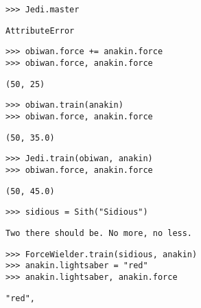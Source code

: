\begin{lstlisting}
>>> Jedi.master
\end{lstlisting}
\begin{solution}[.2in]
\begin{lstlisting}
AttributeError
\end{lstlisting}
\end{solution}

\begin{lstlisting}
>>> obiwan.force += anakin.force
>>> obiwan.force, anakin.force
\end{lstlisting}
\begin{solution}[.2in]
\begin{lstlisting}
(50, 25)
\end{lstlisting}
\end{solution}

\begin{lstlisting}
>>> obiwan.train(anakin)
>>> obiwan.force, anakin.force
\end{lstlisting}
\begin{solution}[.2in]
\begin{lstlisting}
(50, 35.0)
\end{lstlisting}
\end{solution}

\begin{lstlisting}
>>> Jedi.train(obiwan, anakin)
>>> obiwan.force, anakin.force
\end{lstlisting}
\begin{solution}[.2in]
\begin{lstlisting}
(50, 45.0)
\end{lstlisting}
\end{solution}

\begin{lstlisting}
>>> sidious = Sith("Sidious")
\end{lstlisting}
\begin{solution}[.2in]
\begin{lstlisting}
Two there should be. No more, no less.
\end{lstlisting}
\end{solution}

\begin{lstlisting}
>>> ForceWielder.train(sidious, anakin)
>>> anakin.lightsaber = "red"
>>> anakin.lightsaber, anakin.force
\end{lstlisting}
\begin{solution}[.2in]
\begin{lstlisting}
"red", 
\end{lstlisting}
\end{solution}

